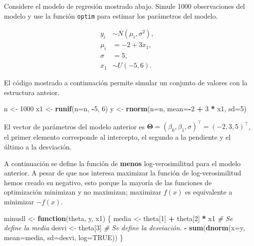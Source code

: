 \documentclass[10pt,]{krantz}
\makeatletter
\newenvironment{Shaded}{\begin{snugshade}}{\end{snugshade}}
\newcommand{\KeywordTok}[1]{\textcolor[rgb]{0.13,0.29,0.53}{\textbf{#1}}}
\newcommand{\DataTypeTok}[1]{\textcolor[rgb]{0.13,0.29,0.53}{#1}}
\newcommand{\DecValTok}[1]{\textcolor[rgb]{0.00,0.00,0.81}{#1}}
\newcommand{\StringTok}[1]{\textcolor[rgb]{0.31,0.60,0.02}{#1}}
\newcommand{\CommentTok}[1]{\textcolor[rgb]{0.56,0.35,0.01}{\textit{#1}}}
\newcommand{\OtherTok}[1]{\textcolor[rgb]{0.56,0.35,0.01}{#1}}
\newcommand{\ControlFlowTok}[1]{\textcolor[rgb]{0.13,0.29,0.53}{\textbf{#1}}}
\newcommand{\OperatorTok}[1]{\textcolor[rgb]{0.81,0.36,0.00}{\textbf{#1}}}
\newcommand{\NormalTok}[1]{#1}
\newenvironment{kframe}{%
\medskip{}
\setlength{\fboxsep}{.8em}
 \def\at@end@of@kframe{}%
 \ifinner\ifhmode%
  \def\at@end@of@kframe{\end{minipage}}%
  \begin{minipage}{\columnwidth}%
 \fi\fi%
 \def\FrameCommand##1{\hskip\@totalleftmargin \hskip-\fboxsep
 \colorbox{shadecolor}{##1}\hskip-\fboxsep
     \hskip-\linewidth \hskip-\@totalleftmargin \hskip\columnwidth}%
 \MakeFramed {\advance\hsize-\width
   \@totalleftmargin\z@ \linewidth\hsize
   \@setminipage}}%
 {\par\unskip\endMakeFramed%
 \at@end@of@kframe}
\renewenvironment{Shaded}{\begin{kframe}}{\end{kframe}}
\makeatother
\begin{document}
Considere el modelo de regresión mostrado abajo. Simule 1000
observaciones del modelo y use la función \texttt{optim} para estimar
los parámetros del modelo.

\begin{align*}
y_i &\sim N(\mu_i, \sigma^2), \\
\mu_i &= -2 + 3 x_1, \\
\sigma &= 5, \\
x_1 &\sim U(-5, 6).
\end{align*}

El código mostrado a continuación permite simular un conjunto de valores
con la estructura anteior.

\begin{Shaded}
\begin{Highlighting}[]
\NormalTok{n <-}\StringTok{ }\DecValTok{1000}
\NormalTok{x1 <-}\StringTok{ }\KeywordTok{runif}\NormalTok{(}\DataTypeTok{n=}\NormalTok{n, }\OperatorTok{-}\DecValTok{5}\NormalTok{, }\DecValTok{6}\NormalTok{)}
\NormalTok{y <-}\StringTok{ }\KeywordTok{rnorm}\NormalTok{(}\DataTypeTok{n=}\NormalTok{n, }\DataTypeTok{mean=}\OperatorTok{-}\DecValTok{2} \OperatorTok{+}\StringTok{ }\DecValTok{3} \OperatorTok{*}\StringTok{ }\NormalTok{x1, }\DataTypeTok{sd=}\DecValTok{5}\NormalTok{)}
\end{Highlighting}
\end{Shaded}

El vector de parámetros del modelo anterior es
\(\boldsymbol{\Theta}=(\beta_0, \beta_1, \sigma)^\top=(-2, 3, 5)^\top\),
el primer elemento corresponde al intercepto, el segundo a la pendiente
y el último a la desviación.

A continuación se define la función de \textbf{menos} log-verosimilitud
para el modelo anterior. A pesar de que nos interesa maximizar la
función de log-verosimilitud hemos creado su negativo, esto porque la
mayoría de las funciones de optimización minimizan y no maximizan;
maximizar \(f(x)\) es equivalente a minimizar \(-f(x)\).

\begin{Shaded}
\begin{Highlighting}[]
\NormalTok{minusll <-}\StringTok{ }\ControlFlowTok{function}\NormalTok{(theta, y, x1) \{}
\NormalTok{  media <-}\StringTok{ }\NormalTok{theta[}\DecValTok{1}\NormalTok{] }\OperatorTok{+}\StringTok{ }\NormalTok{theta[}\DecValTok{2}\NormalTok{] }\OperatorTok{*}\StringTok{ }\NormalTok{x1  }\CommentTok{# Se define la media}
\NormalTok{  desvi <-}\StringTok{ }\NormalTok{theta[}\DecValTok{3}\NormalTok{]                  }\CommentTok{# Se define la desviación.}
  \OperatorTok{-}\StringTok{ }\KeywordTok{sum}\NormalTok{(}\KeywordTok{dnorm}\NormalTok{(}\DataTypeTok{x=}\NormalTok{y, }\DataTypeTok{mean=}\NormalTok{media, }\DataTypeTok{sd=}\NormalTok{desvi, }\DataTypeTok{log=}\OtherTok{TRUE}\NormalTok{))}
\NormalTok{\}}
\end{Highlighting}
\end{Shaded}
\end{document}
